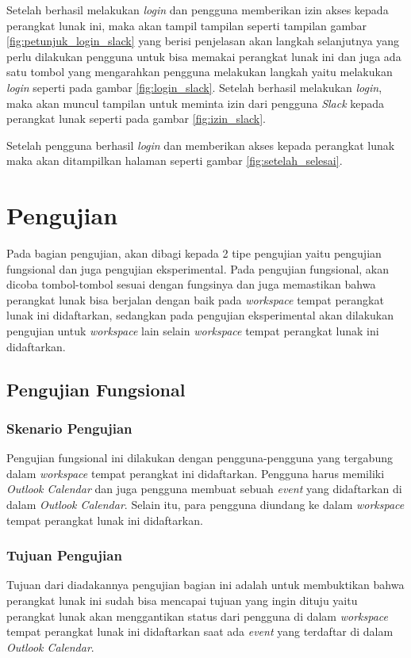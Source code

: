 Setelah berhasil melakukan \textit{login} dan pengguna memberikan izin akses kepada perangkat lunak ini, maka akan tampil tampilan seperti tampilan gambar \ref{fig:petunjuk_login_slack} yang berisi penjelasan akan langkah selanjutnya yang perlu dilakukan pengguna untuk bisa memakai perangkat lunak ini dan juga ada satu tombol yang mengarahkan pengguna melakukan langkah yaitu melakukan \textit{login} seperti pada gambar \ref{fig:login_slack}. Setelah berhasil melakukan \textit{login}, maka akan muncul tampilan untuk meminta izin dari pengguna \textit{Slack} kepada perangkat lunak seperti pada gambar \ref{fig:izin_slack}. 

Setelah pengguna berhasil \textit{login} dan memberikan akses kepada perangkat lunak maka akan ditampilkan halaman seperti gambar \ref{fig:setelah_selesai}. 

\section{Pengujian}
Pada bagian pengujian, akan dibagi kepada 2 tipe pengujian yaitu pengujian fungsional dan juga pengujian eksperimental. Pada pengujian fungsional, akan dicoba tombol-tombol sesuai dengan fungsinya dan juga memastikan bahwa perangkat lunak bisa berjalan dengan baik pada \textit{workspace} tempat perangkat lunak ini didaftarkan, sedangkan pada pengujian eksperimental akan dilakukan pengujian untuk \textit{workspace} lain selain \textit{workspace} tempat perangkat lunak ini didaftarkan. 

\subsection{Pengujian Fungsional}
\subsubsection{Skenario Pengujian}
Pengujian fungsional ini dilakukan dengan pengguna-pengguna yang tergabung dalam \textit{workspace} tempat perangkat ini didaftarkan. Pengguna harus memiliki \textit{Outlook Calendar} dan juga pengguna membuat sebuah \textit{event} yang didaftarkan di dalam \textit{Outlook Calendar}. Selain itu, para pengguna diundang ke dalam \textit{workspace} tempat perangkat lunak ini didaftarkan. 
\subsubsection{Tujuan Pengujian}
Tujuan dari diadakannya pengujian bagian ini adalah untuk membuktikan bahwa perangkat lunak ini sudah bisa mencapai tujuan yang ingin dituju yaitu perangkat lunak akan menggantikan status dari pengguna di dalam \textit{workspace} tempat perangkat lunak ini didaftarkan saat ada \textit{event} yang terdaftar di dalam \textit{Outlook Calendar}.
